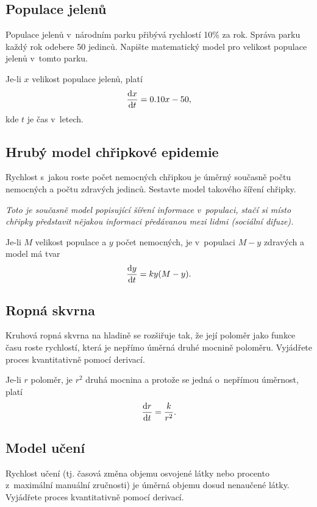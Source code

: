 \stranka


\subsection{Populace jelenů}

 Populace jelenů v~národním parku přibývá rychlostí 10\% za
    rok. Správa parku každý rok odebere 50 jedinců. Napište
    matematický model pro velikost populace jelenů v~tomto parku.

    \reseni
    Je-li $x$ velikost populace jelenů, platí
    \begin{equation*}
      \frac{\mathrm dx}{\mathrm dt}=0.10 x-50, 
    \end{equation*}
    kde $t$ je čas v letech.
\konec


\subsection{Hrubý model chřipkové epidemie}  Rychlost
s jakou roste počet nemocných chřipkou je úměrný současně počtu
nemocných a počtu zdravých jedinců. Sestavte model takového šíření
chřipky.

\textit{Toto je současně model popisující šíření informace v populaci, stačí si místo chřipky představit nějakou informaci předávanou mezi lidmi (sociální difuze).}

\reseni
Je-li $M$ velikost populace a $y$ počet nemocných, je v populaci $M-y$ zdravých a model má tvar
$$\frac{\mathrm dy}{\mathrm dt}=ky(M-y).$$

\konec




\subsection{Ropná skvrna} Kruhová ropná skvrna na hladině se rozšiřuje
tak, že její poloměr jako funkce času roste rychlostí, která je
nepřímo úměrná druhé mocnině poloměru. Vyjádřete proces kvantitativně
pomocí derivací.

\reseni
Je-li $r$ poloměr, je $r^2$ druhá mocnina a protože se jedná o nepřímou úměrnost, platí
$$\frac{\mathrm dr}{\mathrm dt}=\frac{k}{r^2}.$$
\konec

\subsection{Model učení} Rychlost učení (tj. časová změna objemu
osvojené látky nebo procento z~maximální manuální zručnosti) je úměrná
objemu dosud nenaučené látky. Vyjádřete proces kvantitativně pomocí
derivací.

